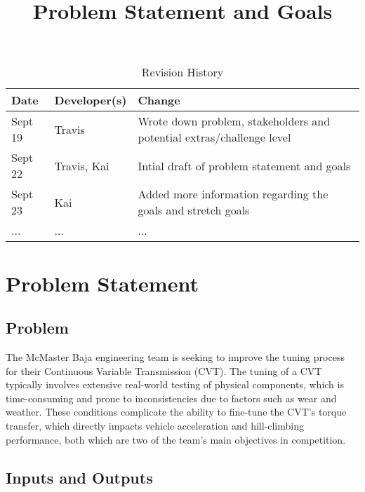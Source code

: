 \documentclass{article}
\title{Problem Statement and Goals\\\progname}
\author{\authname}
\date{}
\begin{document}
\maketitle

\begin{table}[hp]
\caption{Revision History} \label{TblRevisionHistory}
\begin{tabularx}{\textwidth}{llX}
\toprule
\textbf{Date} & \textbf{Developer(s)} & \textbf{Change}\\
\midrule
Sept 19 & Travis & Wrote down problem, stakeholders and potential extras/challenge level\\
Sept 22 & Travis, Kai & Intial draft of problem statement and goals\\
Sept 23 & Kai & Added more information regarding the goals and stretch goals\\
... & ... & ...\\
\bottomrule
\end{tabularx}
\end{table}

\section{Problem Statement}

\subsection{Problem}
The McMaster Baja engineering team is seeking to improve the tuning process for their Continuous Variable Transmission (CVT). The tuning of a CVT typically involves extensive real-world testing of physical components, which is time-consuming and prone to inconsistencies due to factors such as wear and weather. These conditions complicate the ability to fine-tune the CVT’s torque transfer, which directly impacts vehicle acceleration and hill-climbing performance, both which are two of the team's main objectives in competition.


\subsection{Inputs and Outputs}
\end{document}
